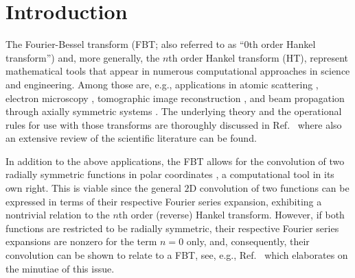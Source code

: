 \documentclass[review]{elsarticle}
\begin{document}
\section{Introduction}

The Fourier-Bessel transform (FBT; also referred to as ``$0$th order Hankel
transform'') and, more generally, the $n$th order Hankel transform (HT),
represent mathematical tools that appear in numerous computational approaches
in science and engineering.  Among those are, e.g., applications in atomic
scattering \cite{Talman:1978}, electron microscopy \cite{FiskJohnson:1987},
tomographic image reconstruction \cite{Higgins:1988}, and beam propagation
through axially symmetric systems \cite{GuizarSicairos:2004}.  
The underlying theory and the operational rules for use with those transforms
are thoroughly discussed in Ref.~\cite{Baddour:2015} where also an extensive
review of the scientific literature can be found.

In addition to the above applications, the FBT allows for the convolution of
two radially symmetric functions in polar coordinates \cite{Baddour:2009}, a
computational tool in its own right.  This is viable since the general $2$D
convolution of two functions can be expressed in terms of their respective
Fourier series expansion, exhibiting a nontrivial relation to the $n$th order
(reverse) Hankel transform. 
However, if both functions are restricted to be radially symmetric, their
respective Fourier series expansions are nonzero for the term $n=0$ only, and,
consequently, their convolution can be shown to relate to a FBT, see, e.g., 
Ref.~\cite{Baddour:2009} which elaborates  on the minutiae of this issue.  
\end{document}
